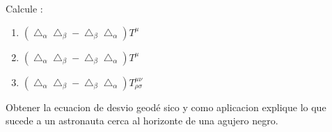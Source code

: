 \documentclass[12pt,a4paper]{practice}
\begin{document}
    \begin{problem}\label{prob:8}
        Calcule :
        \begin{enumerate}[label=\alph*)]
                \item $(\bigtriangleup_{\alpha}\bigtriangleup_{\beta} - \bigtriangleup_{\beta}\bigtriangleup_{\alpha})T^{\mu}$
                \item $(\bigtriangleup_{\alpha}\bigtriangleup_{\beta} - \bigtriangleup_{\beta}\bigtriangleup_{\alpha})T^{\mu}$
                \item $(\bigtriangleup_{\alpha}\bigtriangleup_{\beta} - \bigtriangleup_{\beta}\bigtriangleup_{\alpha})T^{\mu\nu}_{\rho \sigma}$
        \end{enumerate}       
    \end{problem}
    
    \begin{problem}\label{prob:9}
        Obtener la ecuacion de desvio geodé sico y como aplicacion explique lo que sucede a un astronauta cerca al horizonte de una agujero negro.    
    \end{problem}
    
\end{document}
